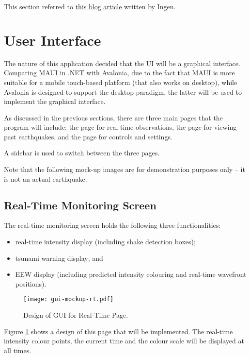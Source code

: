 This section referred to \href{https://qiita.com/ingen084/items/82985e8d3227c97c608d}{this blog article} written by Ingen.

\section{User Interface}

The nature of this application decided that the UI will be a graphical interface. Comparing MAUI in .NET with Avalonia, due to the fact that MAUI is more suitable for a mobile touch-based platform (that also works on desktop), while Avalonia is designed to support the desktop paradigm, the latter will be used to implement the graphical interface.

As discussed in the previous sections, there are three main pages that the program will include: the page for real-time observations, the page for viewing past earthquakes, and the page for controls and settings.

A sidebar is used to switch between the three pages.

Note that the following mock-up images are for demonstration purposes only -- it is not an actual earthquake.

\subsection{Real-Time Monitoring Screen}

The real-time monitoring screen holds the following three functionalities:
\begin{itemize}
    \item real-time intensity display (including shake detection boxes);
    \item tsunami warning display; and
    \item EEW display (including predicted intensity colouring and real-time wavefront positions).
\end{itemize}

\begin{figure}[!ht]
    \centering
    \texttt{[image: gui-mockup-rt.pdf]}
    \caption{Design of GUI for Real-Time Page.}
    \label{fig:gui-mockup-rt}
\end{figure}

Figure \ref{fig:gui-mockup-rt} shows a design of this page that will be implemented. The real-time intensity colour points, the current time and the colour scale will be displayed at all times.

